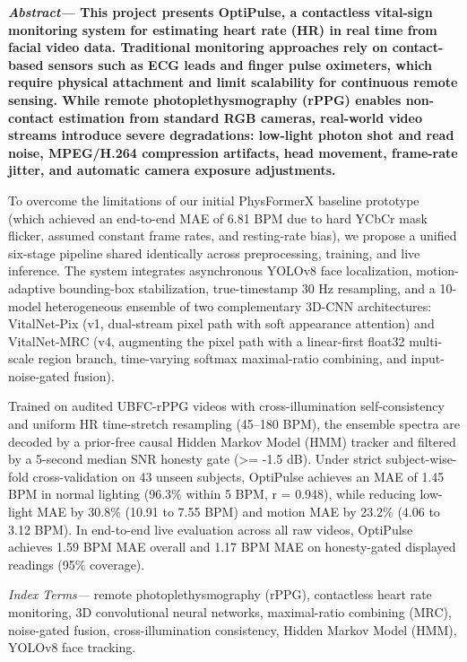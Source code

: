 \documentclass[twocolumn,letterpaper]{article}
\newcommand\abssize{\fontsize{8.6}{10.15}\selectfont}
\newcommand\lb{\linebreak[4]\relax}                         %
\begin{document}
{\abssize\bfseries\setlength\parindent{9.5pt}\setlength\parskip{2pt}
\textit{Abstract---} This project presents OptiPulse, a contactless\lb
vital-sign monitoring system for estimating heart rate (HR) in real\lb
time from facial video data. Traditional monitoring approaches\lb
rely on contact-based sensors such as ECG leads and finger pulse\lb
oximeters, which require physical attachment and limit scalability\lb
for continuous remote sensing. While remote\newline
photoplethysmography (rPPG) enables non-contact estimation\lb
from standard RGB cameras, real-world video streams introduce\lb
severe degradations: low-light photon shot and read noise,\lb
MPEG/H.264 compression artifacts, head movement, frame-rate\lb
jitter, and automatic camera exposure adjustments.

To overcome the limitations of our initial PhysFormerX\lb
baseline prototype (which achieved an end-to-end MAE of 6.81\lb
BPM due to hard YCbCr mask flicker, assumed constant frame\lb
rates, and resting-rate bias), we propose a unified six-stage\lb
pipeline shared identically across preprocessing, training, and live\lb
inference. The system integrates asynchronous YOLOv8 face\lb
localization, motion-adaptive bounding-box stabilization,\lb
true-timestamp 30 Hz resampling, and a 10-model heterogeneous\lb
ensemble of two complementary 3D-CNN architectures:\lb
VitalNet-Pix (v1, dual-stream pixel path with soft appearance\lb
attention) and VitalNet-MRC (v4, augmenting the pixel path with\lb
a linear-first float32 multi-scale region branch, time-varying\lb
softmax maximal-ratio combining, and input-noise-gated fusion).

Trained on audited UBFC-rPPG videos with cross-illumination\lb
self-consistency and uniform HR time-stretch resampling (45--180\lb
BPM), the ensemble spectra are decoded by a prior-free causal\lb
Hidden Markov Model (HMM) tracker and filtered by a 5-second\lb
median SNR honesty gate (>= -1.5 dB). Under strict subject-wise\lb
5-fold cross-validation on 43 unseen subjects, OptiPulse achieves\lb
an MAE of 1.45 BPM in normal lighting (96.3\% within 5 BPM, r\lb
= 0.948), while reducing low-light MAE by 30.8\% (10.91 to 7.55\lb
BPM) and motion MAE by 23.2\% (4.06 to 3.12 BPM). In\lb
end-to-end live evaluation across all raw videos, OptiPulse\lb
achieves 1.59 BPM MAE overall and 1.17 BPM MAE on\lb
honesty-gated displayed readings (95\% coverage).

\vspace{2.3pt}
\textit{Index Terms---} remote photoplethysmography (rPPG),\lb
contactless heart rate monitoring, 3D convolutional neural\lb
networks, maximal-ratio combining (MRC), noise-gated fusion,\lb
cross-illumination consistency, Hidden Markov Model (HMM),\lb
YOLOv8 face tracking.\par}
\end{document}
